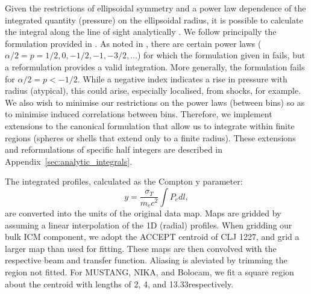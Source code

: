 \documentclass[twocolumn,traditabstract]{aa}
\begin{document}

Given the restrictions of ellipsoidal symmetry and a power law dependence of the integrated quantity (pressure) on the
ellipsoidal radius, it is possible to calculate the integral along the line of sight analytically
\citep[e.g.][]{vikhlinin2001a,korngut2011}. We follow
principally the formulation provided in \citet{korngut2011}. As noted in \citet{sarazin2016}, there are certain power
laws ($\alpha/2 = p = 1/2, 0 , -1/2, -1, -3/2, ...$) for which the formulation given in \citet{korngut2011} fails,
but a reformulation provides a valid integration. More generally, the formulation fails for $\alpha/2 = p < -1/2$.
While a negative index indicates a rise in pressure with radius (atypical), this could arise, especially localised,
from shocks, for example. We also wish to minimise our restrictions on the power laws (between bins) so as to minimise
induced correlations between bins. Therefore, we implement extensions to the canonical formulation that allow us to
integrate within finite regions (spheres or shells that extend only to a finite radius). These extensions and
reformulations of specific half integers are described in Appendix~\ref{sec:analytic_integrals}.

The integrated profiles, calculated as the Compton y parameter:
\begin{equation}
  y = \frac{\sigma_T}{m_e c^2} \int P_e dl,
  \label{eqn:compton_y}
\end{equation}
are converted into the units of the original data map. Maps are gridded by assuming a linear interpolation
of the 1D (radial) profiles. When gridding our bulk ICM component, we adopt the ACCEPT centroid of CLJ 1227,
and grid a larger map than used for fitting.
These maps are then convolved with the respective beam and transfer function. Aliasing is aleviated by trimming
the region not fitted. For MUSTANG, NIKA, and Bolocam, we fit a square region about the centroid with lengths
of 2\amin, 4\amin, and 13.33\amin respectively.
\end{document}
